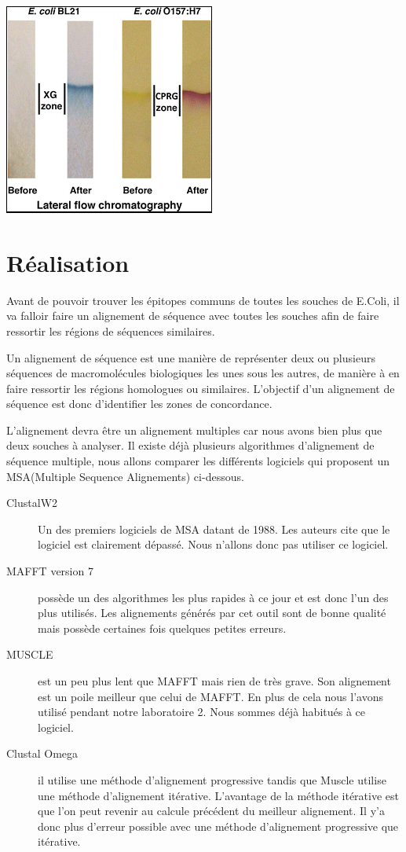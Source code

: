 \documentclass{article}
\begin{document}
      {\centering
        \includegraphics{./img/ecoli.png}\\
      \par}

  \newpage
  \section{Réalisation}
    Avant de pouvoir trouver les épitopes communs de toutes les souches de E.Coli, il va falloir faire un alignement de séquence avec toutes les souches afin de faire ressortir les régions de séquences similaires.

    Un alignement de séquence est une manière de représenter deux ou plusieurs séquences de macromolécules biologiques les unes sous les autres, de manière à en faire ressortir les régions homologues ou similaires. L'objectif d'un alignement de séquence est donc d'identifier les zones de concordance.

    L'alignement devra être un alignement multiples car nous avons bien plus que deux souches à analyser. Il existe déjà plusieurs algorithmes d'alignement de séquence multiple, nous allons comparer les différents logiciels qui proposent un MSA(Multiple Sequence Alignements) ci-dessous. \cite{wiki:Online}

    \begin{description}
      \item[ClustalW2] Un des premiers logiciels de MSA datant de 1988. Les auteurs cite que le logiciel est clairement dépassé. Nous n'allons donc pas utiliser ce logiciel.
      \item[MAFFT version 7] possède un des algorithmes les plus rapides à ce jour et est donc l'un des plus utilisés. Les alignements générés par cet outil sont de bonne qualité mais possède certaines fois quelques petites erreurs.
      \item[MUSCLE] est un peu plus lent que MAFFT mais rien de très grave. Son alignement est un poile meilleur que celui de MAFFT. En plus de cela nous l'avons utilisé pendant notre laboratoire 2. Nous sommes déjà habitués à ce logiciel.
      \item[Clustal Omega] il utilise une méthode d'alignement progressive tandis que Muscle utilise une méthode d'alignement itérative. L'avantage de la méthode itérative est que l'on peut revenir au calcule précédent du meilleur alignement. Il y'a donc plus d'erreur possible avec une méthode d'alignement progressive que itérative.
    \end{description}
\end{document}
